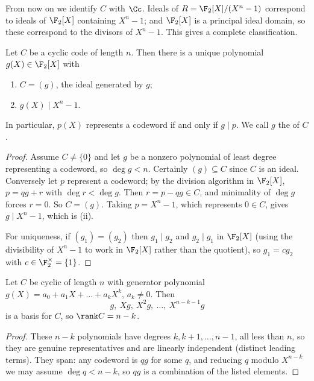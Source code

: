 From now on we identify $C$ with $\Cc$. Ideals of $R = \F_2[X]/(X^n-1)$ correspond to ideals of $\F_2[X]$ containing $X^n-1$; and $\F_2[X]$ is a principal ideal domain, so these correspond to the divisors of $X^n - 1$. This gives a complete classification.

\begin{theorem}\label{thm:genpoly}
	Let $C$ be a cyclic code of length $n$. Then there is a unique polynomial $g(X) \in \F_2[X]$ with
	\begin{enumerate}[label=(\roman*)]
		\item $C = (g)$, the ideal generated by $g$;
		\item $g(X) \mid X^n-1$.
	\end{enumerate}
	In particular, $p(X)$ represents a codeword if and only if $g \mid p$. We call $g$ the  of $C$.
\end{theorem}

\begin{proof}
	Assume $C \ne \{0\}$ and let $g$ be a nonzero polynomial of least degree representing a codeword, so $\deg g < n$. Certainly $(g) \subseteq C$ since $C$ is an ideal. Conversely let $p$ represent a codeword; by the division algorithm in $\F_2[X]$, $p = qg+r$ with $\deg r< \deg g$. Then $r = p - qg \in C$, and minimality of $\deg g$ forces $r=0$. So $C = (g)$. Taking $p = X^n-1$, which represents $0 \in C$, gives $g \mid X^n-1$, which is (ii).

	For uniqueness, if $(g_1) = (g_2)$ then $g_1 \mid g_2$ and $g_2 \mid g_1$ in $\F_2[X]$ (using the divisibility of $X^n-1$ to work in $\F_2[X]$ rather than the quotient), so $g_1 = cg_2$ with $c \in \F_2^\times = \{1\}$.
\end{proof}

\begin{lemma}\label{lem:cyclicbasis}
	Let $C$ be cyclic of length $n$ with generator polynomial $g(X) = a_0+a_1X+\dots+a_kX^k$, $a_k \ne 0$. Then
	$$g,\ Xg,\ X^2g,\ \dots,\ X^{n-k-1}g$$
	is a basis for $C$, so $\rank C = n-k$.
\end{lemma}

\begin{proof}
	These $n-k$ polynomials have degrees $k, k+1, \dots, n-1$, all less than $n$, so they are genuine representatives and are linearly independent (distinct leading terms). They span: any codeword is $qg$ for some $q$, and reducing $q$ modulo $X^{n-k}$ we may assume $\deg q < n-k$, so $qg$ is a combination of the listed elements.
\end{proof}

